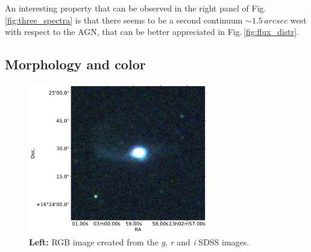 \documentclass[../thesis.tex]{subfiles}
\begin{document}
An interesting property that can be observed in the right panel of Fig.\,\ref{fig:three_spectra} is that there seems to be a second continuum $\sim 1.5\,\si{arcsec}$ west with respect to the AGN, that can be better appreciated in Fig.\,\ref{fig:flux_distr}.

\subsection{Morphology and color}
\label{sec:morph_color}

\begin{figure}
\centering
\includegraphics[width=0.7\textwidth]{images/paper3/new_rgb.pdf} %
\caption[]{\textbf{Left:} RGB image created from the \emph{g}, \emph{r} and \emph{i} SDSS images.} %
\label{fig:rgb_sdss}
\end{figure} 
\end{document}
